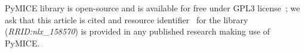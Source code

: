 PyMICE library is open-source and is available for free
under GPL3 license~\cite{gpl}; we ask that this article is cited and resource
identifier~\cite{ozyurt2016} for the library (\emph{RRID:nlx\_158570}) is provided
in any published research making use of PyMICE.

